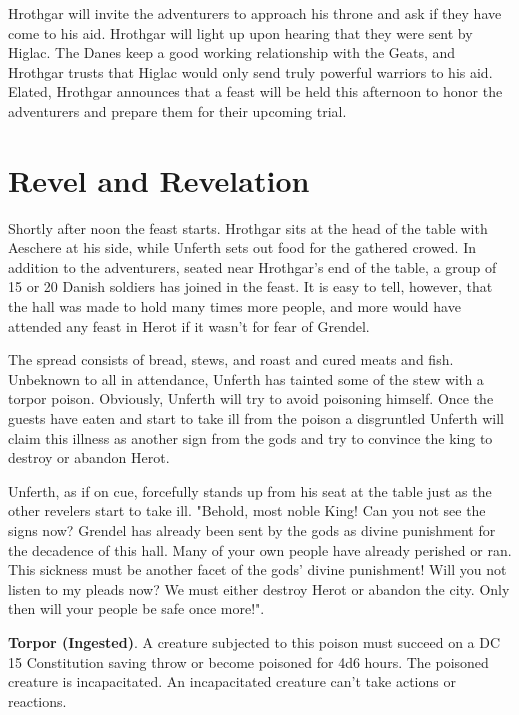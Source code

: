 \documentclass[10pt,twoside,twocolumn,openany]{book}
\begin{document}
Hrothgar will invite the adventurers to approach his throne and ask if they have come to his aid. Hrothgar will light up upon hearing that they were sent by Higlac. The Danes keep a good working relationship with the Geats, and Hrothgar trusts that Higlac would only send truly powerful warriors to his aid. Elated, Hrothgar announces that a feast will be held this afternoon to honor the adventurers and prepare them for their upcoming trial.

\section{Revel and Revelation}
Shortly after noon the feast starts. Hrothgar sits at the head of the table with Aeschere at his side, while Unferth sets out food for the gathered crowed. In addition to the adventurers, seated near Hrothgar's end of the table, a group of 15 or 20 Danish soldiers has joined in the feast. It is easy to tell, however, that the hall was made to hold many times more people, and more would have attended any feast in Herot if it wasn't for fear of Grendel.

The spread consists of bread, stews, and roast and cured meats and fish. Unbeknown to all in attendance, Unferth has tainted some of the stew with a torpor poison. Obviously, Unferth will try to avoid poisoning himself. Once the guests have eaten and start to take ill from the poison a disgruntled Unferth will claim this illness as another sign from the gods and try to convince the king to destroy or abandon Herot.

\begin{quotebox}
Unferth, as if on cue, forcefully stands up from his seat at the table just as the other revelers start to take ill. "Behold, most noble King! Can you not see the signs now? Grendel has already been sent by the gods as divine punishment for the decadence of this hall. Many of your own people have already perished or ran. This sickness must be another facet of the gods' divine punishment! Will you not listen to my pleads now? We must either destroy Herot or abandon the city. Only then will your people be safe once more!".
\end{quotebox}

\begin{paperbox}{}
\textbf{Torpor (Ingested)}. A creature subjected to this poison must succeed on a DC 15 Constitution saving throw or become poisoned for 4d6 hours. The poisoned creature is incapacitated. An incapacitated creature can't take actions or reactions.
\end{paperbox}
\end{document}
